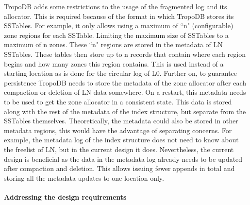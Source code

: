 TropoDB adds some restrictions to the usage of the fragmented log and its allocator. This is required because of the format in which TropoDB stores its SSTables. For example, it only allows using a maximum of ``n" (configurable) zone regions for each SSTable. Limiting the maximum size of SSTables to a maximum of n zones. These ``n" regions are stored in the metadata of LN SSTables. These tables then store up to n records that contain where each region begins and how many zones this region contains. This is used instead of a starting location as is done for the circular log of L0. Further on, to guarantee persistence TropoDB needs to store the metadata of the zone allocator after each compaction or deletion of LN data somewhere. On a restart, this metadata needs to be used to get the zone allocator in a consistent state. This data is stored along with the rest of the metadata of the index structure, but separate from the SSTables themselves. Theoretically, the metadata could also be stored in other metadata regions, this would have the advantage of separating concerns. For example, the metadata log of the index structure does not need to know about the freelist of LN, but in the current design it does. Nevertheless, the current design is beneficial as the data in the metadata log already needs to be updated after compaction and deletion. This allows issuing fewer appends in total and storing all the metadata updates to one location only.\\\\
\textbf{Addressing the design requirements}\\
